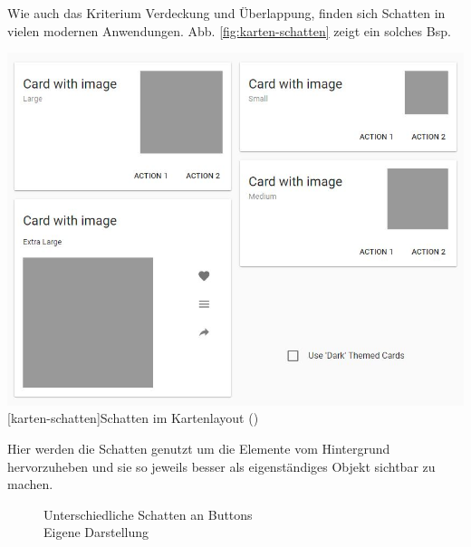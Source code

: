 Wie auch das Kriterium Verdeckung und Überlappung, finden sich Schatten in vielen modernen Anwendungen. Abb. \ref{fig:karten-schatten} zeigt ein solches Bsp.

\vspace{1em}
\begin{minipage}{\linewidth}
	\centering
	\includegraphics[width=0.7\linewidth]{images/karten_schatten.jpg}
	[karten-schatten]{Schatten im Kartenlayout (\cite{goo17})}
	\label{fig:karten-schatten}
\end{minipage}
\vspace{1em}

Hier werden die Schatten genutzt um die Elemente vom Hintergrund hervorzuheben und sie so jeweils besser als eigenständiges Objekt sichtbar zu machen.

\begin{figure}[!ht]
\centering
{}
\caption[Unterschiedliche Schatten an Buttons]{Unterschiedliche Schatten an Buttons\\ Eigene Darstellung}
\label{sample_schatten}
\end{figure}

